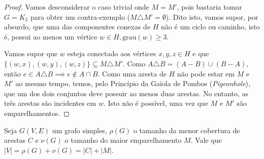 \documentclass{homework}
\begin{document}
	\begin{proof}
	Vamos desconsiderar o caso trivial onde $M = M'$, pois bastaria tomar $G = K_2$ para obter um contra-exemplo ($M \triangle M' = \emptyset$). Dito isto, vamos supor, por absurdo, que uma das componentes conexas de $H$ não é um ciclo ou caminho, isto é, possui ao menos um vértice $w \in H, \text{grau}(w) \ge 3$.
	
	\begin{fig}
		
	\end{fig}

	Vamos supor que $w$ esteja conectado aos vértices $x, y, z \in H$ e que $\{(w, x), (w, y), (w, z)\} \subseteq M \triangle M'$. Como $A \triangle B = (A - B) \cup (B - A)$, então $e \in A \triangle B \implies e \notin A \cap B$. Como uma aresta de $H$ não pode estar em $M$ e $M'$ ao mesmo tempo, temos, pelo Princípio da Gaiola de Pombos (\textit{Pigeonhole}), que um dos dois conjuntos deve possuir ao menos duas arestas. No entanto, as três arestas são incidentes em $w$. Isto não é possível, uma vez que $M$ e $M'$ são emparelhamentos.
	\end{proof}
	
	\quest %
	
	\begin{theorem}
		Seja $G(V,E)$ um grafo simples, $\rho(G)$ o tamanho da menor cobertura de arestas $C$ e $\nu(G)$ o tamanho do maior emparelhamento $M$. Vale que $|V| = \rho(G) + \nu(G) = |C| + |M|$.
	\end{theorem}	
	
\end{document}
